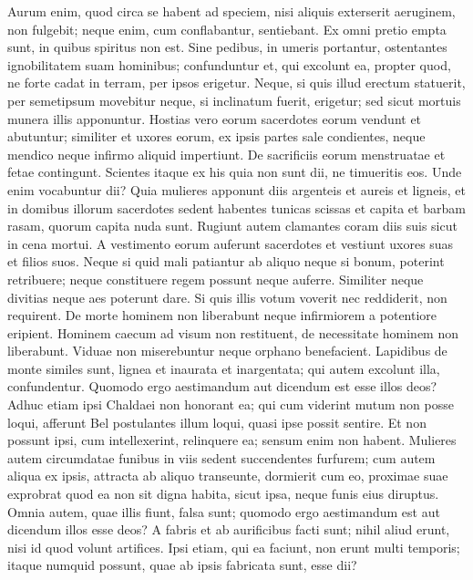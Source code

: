 \begin{biblechapter}
\begin{biblechapter}
\begin{biblechapter}
\begin{biblechapter}
\begin{biblechapter}
\begin{biblechapter}
 \verse Aurum enim, quod circa se habent ad speciem, nisi aliquis exterserit aeruginem, non fulgebit; neque enim, cum conflabantur, sentiebant. 
\verse Ex omni pretio empta sunt, in quibus spiritus non est. 
\verse Sine pedibus, in umeris portantur, ostentantes ignobilitatem suam hominibus; confunduntur et, qui excolunt ea, 
\verse propter quod, ne forte cadat in terram, per ipsos erigetur. Neque, si quis illud erectum statuerit, per semetipsum movebitur neque, si inclinatum fuerit, erigetur; sed sicut mortuis munera illis apponuntur. 
\verse Hostias vero eorum sacerdotes eorum vendunt et abutuntur; similiter et uxores eorum, ex ipsis partes sale condientes, neque mendico neque infirmo aliquid impertiunt. De sacrificiis eorum menstruatae et fetae contingunt. 
\verse Scientes itaque ex his quia non sunt dii, ne timueritis eos.
 \verse Unde enim vocabuntur dii? Quia mulieres apponunt diis argenteis et aureis et ligneis, 
\verse et in domibus illorum sacerdotes sedent habentes tunicas scissas et capita et barbam rasam, quorum capita nuda sunt. 
\verse Rugiunt autem clamantes coram diis suis sicut in cena mortui. 
\verse A vestimento eorum auferunt sacerdotes et vestiunt uxores suas et filios suos. 
\verse Neque si quid mali patiantur ab aliquo neque si bonum, poterint retribuere; neque constituere regem possunt neque auferre. 
\verse Similiter neque divitias neque aes poterunt dare. Si quis illis votum voverit nec reddiderit, non requirent. 
\verse De morte hominem non liberabunt neque infirmiorem a potentiore eripient. 
\verse Hominem caecum ad visum non restituent, de necessitate hominem non liberabunt. 
\verse Viduae non miserebuntur neque orphano benefacient. 
\verse Lapidibus de monte similes sunt, lignea et inaurata et inargentata; qui autem excolunt illa, confundentur. 
\verse Quomodo ergo aestimandum aut dicendum est esse illos deos?
 \verse Adhuc etiam ipsi Chaldaei non honorant ea; qui cum viderint mutum non posse loqui, afferunt Bel postulantes illum loqui, 
\verse quasi ipse possit sentire. Et non possunt ipsi, cum intellexerint, relinquere ea; sensum enim non habent. 
 \verse Mulieres autem circumdatae funibus in viis sedent succendentes furfurem; 
 \verse cum autem aliqua ex ipsis, attracta ab aliquo transeunte, dormierit cum eo, proximae suae exprobrat quod ea non sit digna habita, sicut ipsa, neque funis eius diruptus. 
\verse Omnia autem, quae illis fiunt, falsa sunt; quomodo ergo aestimandum est aut dicendum illos esse deos?
 \verse A fabris et ab aurificibus facti sunt; nihil aliud erunt, nisi id quod volunt artifices. 
\verse Ipsi etiam, qui ea faciunt, non erunt multi temporis; itaque numquid possunt, quae ab ipsis fabricata sunt, esse dii? 

\end{biblechapter}
\end{biblechapter}
\end{biblechapter}
\end{biblechapter}
\end{biblechapter}
\end{biblechapter}
